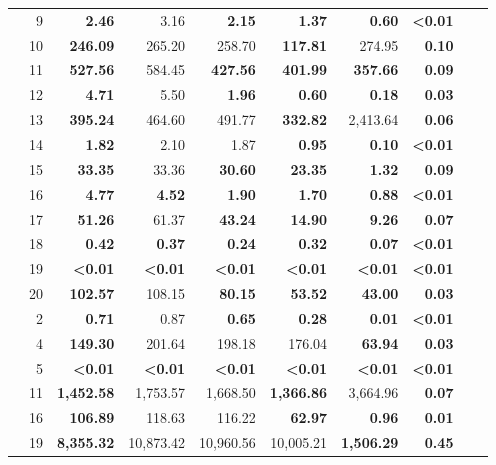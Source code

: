 \begin{table}
\begin{tabular}{crrrrrrrrr}
& 9 & \textbf{2.46} & 3.16 & \textbf{2.15} & \textbf{1.37} & \textbf{0.60} & \textbf{<0.01} \\
& 10 & \textbf{246.09} & 265.20 & 258.70 & \textbf{117.81} & 274.95 & \textbf{0.10} \\
& 11 & \textbf{527.56} & 584.45 & \textbf{427.56} & \textbf{401.99} & \textbf{357.66} & \textbf{0.09} \\
& 12 & \textbf{4.71} & 5.50 & \textbf{1.96} & \textbf{0.60} & \textbf{0.18} & \textbf{0.03} \\
& 13 & \textbf{395.24} & 464.60 & 491.77 & \textbf{332.82} & 2,413.64 & \textbf{0.06} \\
& 14 & \textbf{1.82} & 2.10 & 1.87 & \textbf{0.95} & \textbf{0.10} & \textbf{<0.01} \\
& 15 & \textbf{33.35} & 33.36 & \textbf{30.60} & \textbf{23.35} & \textbf{1.32} & \textbf{0.09} \\
& 16 & \textbf{4.77} & \textbf{4.52} & \textbf{1.90} & \textbf{1.70} & \textbf{0.88} & \textbf{<0.01} \\
& 17 & \textbf{51.26} & 61.37 & \textbf{43.24} & \textbf{14.90} & \textbf{9.26} & \textbf{0.07} \\
& 18 & \textbf{0.42} & \textbf{0.37} & \textbf{0.24} & \textbf{0.32} & \textbf{0.07} & \textbf{<0.01} \\
& 19 & \textbf{<0.01} & \textbf{<0.01} & \textbf{<0.01} & \textbf{<0.01} & \textbf{<0.01} & \textbf{<0.01} \\
& 20 & \textbf{102.57} & 108.15 & \textbf{80.15} & \textbf{53.52} & \textbf{43.00} & \textbf{0.03} \\
\noalign{\medskip}
\parbox[t]{2mm}{} &
2 & \textbf{0.71} & 0.87 & \textbf{0.65} & \textbf{0.28} & \textbf{0.01} & \textbf{<0.01} \\
& 4 & \textbf{149.30} & 201.64 & 198.18 & 176.04 & \textbf{63.94} & \textbf{0.03} \\
& 5 & \textbf{<0.01} & \textbf{<0.01} & \textbf{<0.01} & \textbf{<0.01} & \textbf{<0.01} & \textbf{<0.01} \\
& 11 & \textbf{1,452.58} & 1,753.57 & 1,668.50 & \textbf{1,366.86} & 3,664.96 & \textbf{0.07} \\
& 16 & \textbf{106.89} & 118.63 & 116.22 & \textbf{62.97} & \textbf{0.96} & \textbf{0.01} \\
& 19 & \textbf{8,355.32} & 10,873.42 & 10,960.56 & 10,005.21 & \textbf{1,506.29} & \textbf{0.45} \\
\hline
\end{tabular}
\end{table}

